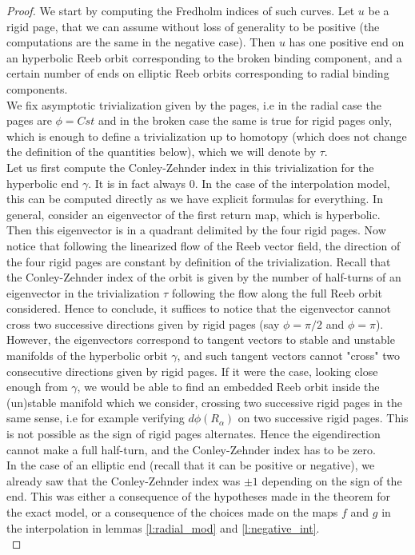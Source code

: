 \documentclass[../main.tex]{subfiles}
\begin{document}
\begin{proof}
We start by computing the Fredholm indices of such curves. Let $u$ be a rigid page, that we can assume without loss of generality to be positive (the computations are the same in the negative case). Then $u$ has one positive end on an hyperbolic Reeb orbit corresponding to the broken binding component, and a certain number of ends on elliptic Reeb orbits corresponding to radial binding components. \\

We fix asymptotic trivialization given by the pages, i.e in the radial case the pages are $\phi = Cst$ and in the broken case the same is true for rigid pages only, which is enough to define a trivialization up to homotopy (which does not change the definition of the quantities below), which we will denote by $\tau$. \\

Let us first compute the Conley-Zehnder index in this trivialization for the hyperbolic end $\gamma$. It is in fact always $0$. In the case of the interpolation model, this can be computed directly as we have explicit formulas for everything. In general, consider an eigenvector of the first return map, which is hyperbolic. Then this eigenvector is in a quadrant delimited by the four rigid pages. Now notice that following the linearized flow of the Reeb vector field, the direction of the four rigid pages are constant by definition of the trivialization. Recall that the Conley-Zehnder index of the orbit is given by the number of half-turns of an eigenvector in the trivialization $\tau$ following the flow along the full Reeb orbit considered. Hence to conclude, it suffices to notice that the eigenvector cannot cross two successive directions given by rigid pages (say $\phi = \pi/2$ and $\phi = \pi$). However, the eigenvectors correspond to tangent vectors to stable and unstable manifolds of the hyperbolic orbit $\gamma$, and such tangent vectors cannot "cross" two consecutive directions given by rigid pages. If it were the case, looking close enough from $\gamma$, we would be able to find an embedded Reeb orbit inside the (un)stable manifold which we consider, crossing two successive rigid pages in the same sense, i.e for example verifying $d\phi(R_\alpha)$ on two successive rigid pages. This is not possible as the sign of rigid pages alternates. Hence the eigendirection cannot make a full half-turn, and the Conley-Zehnder index has to be zero.\\

In the case of an elliptic end (recall that it can be positive or negative), we already saw that the Conley-Zehnder index was $\pm1$ depending on the sign of the end. This was either a consequence of the hypotheses made in the theorem for the exact model, or a consequence of the choices made on the maps $f$ and $g$ in the interpolation in lemmas \ref{l:radial_mod} and \ref{l:negative_int}.\\


\end{proof}
\end{document}
